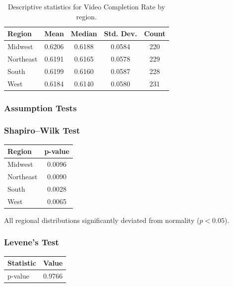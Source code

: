 \begin{table}[H]
	\centering
	\caption{Descriptive statistics for Video Completion Rate by region.}
	\begin{tabular}{lcccc}
		\toprule
		Region & Mean & Median & Std. Dev. & Count \\
		\midrule
		Midwest & 0.6206 & 0.6188 & 0.0584 & 220 \\
		Northeast & 0.6191 & 0.6165 & 0.0578 & 229 \\
		South & 0.6199 & 0.6160 & 0.0587 & 228 \\
		West & 0.6184 & 0.6140 & 0.0580 & 231 \\
		\bottomrule
	\end{tabular}
\end{table}

\subsubsection{Assumption Tests}

\subsubsection{Shapiro--Wilk Test}

\begin{table}[H]
	\centering
	\begin{tabular}{lc}
		\toprule
		Region & p-value \\
		\midrule
		Midwest & 0.0096 \\
		Northeast & 0.0090 \\
		South & 0.0028 \\
		West & 0.0065 \\
		\bottomrule
	\end{tabular}
\end{table}

All regional distributions significantly deviated from normality ($p<0.05$).

\vspace{0.3cm}

\subsubsection{Levene's Test}

\begin{table}[H]
	\centering
	\begin{tabular}{lc}
		\toprule
		Statistic & Value \\
		\midrule
		p-value & 0.9766 \\
		\bottomrule
	\end{tabular}
\end{table}

